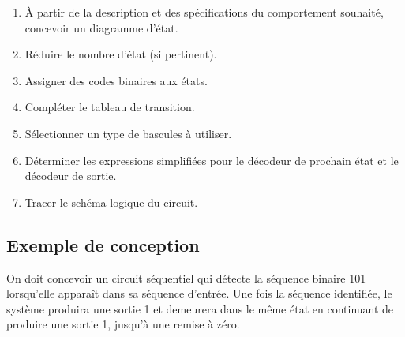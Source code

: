 \documentclass[11pt]{article}
\begin{document}
\begin{enumerate}
\item À partir de la description et des spécifications du comportement
souhaité, concevoir un diagramme d'état.
\item Réduire le nombre d'état (si pertinent).
\item Assigner des codes binaires aux états.
\item Compléter le tableau de transition.
\item Sélectionner un type de bascules à utiliser.
\item Déterminer les expressions simplifiées pour le décodeur de prochain
état et le décodeur de sortie.
\item Tracer le schéma logique du circuit.
\end{enumerate}

\subsection{Exemple de conception}
\label{sec:org653f5d9}

On doit concevoir un circuit séquentiel qui détecte la séquence
binaire 101 lorsqu'elle apparaît dans sa séquence d'entrée. Une fois
la séquence identifiée, le système produira une sortie 1 et demeurera
dans le même état en continuant de produire une sortie 1, jusqu'à une
remise à zéro.
\end{document}
